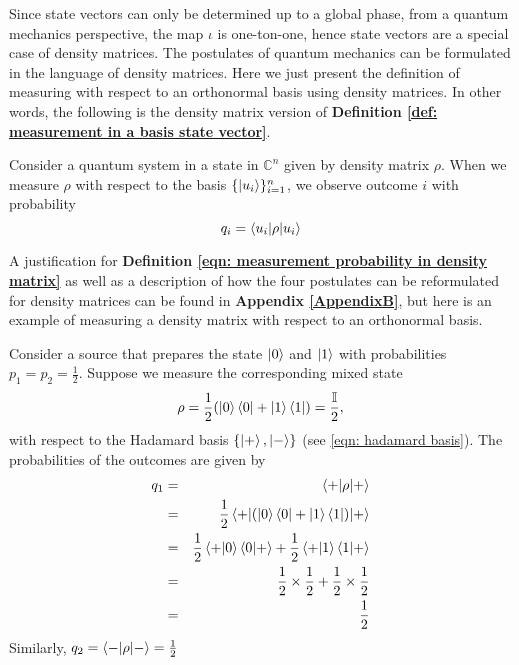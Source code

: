 Since state vectors can only be determined up to a global phase, from a quantum mechanics perspective, the map $\iota$ is one-ton-one, hence state vectors are a special case of density matrices. The postulates of quantum mechanics can be formulated in the language of density matrices. Here we just present the definition of measuring with respect to an orthonormal basis using density matrices. In other words, the following is the density matrix version of \textbf{Definition \ref{def: measurement in a basis state vector}}.


\begin{definition}
Consider a quantum system in a state in $\mathbb{C}^n$ given by density matrix $\rho$.  When we measure $\rho$ with respect to the basis $\{\ket{u_i}\}_{i=1}^n$, we observe outcome $i$ with probability 
\begin{equation} \label{eqn: measurement probability in density matrix}
    q_i=\braket{u_i | \rho |u_i}
\end{equation}
\end{definition}


A justification for \textbf{Definition \ref{eqn: measurement probability in density matrix}} as well as a description of how the four postulates can be reformulated for density matrices can be found in \textbf{Appendix \ref{AppendixB}}, but here is an example of measuring a density matrix with respect to an orthonormal basis.

\begin{example}
Consider a source that prepares the state $\ket{0}$ and $\ket{1}$ with probabilities $p_1=p_2=\frac{1}{2}$. Suppose we measure the corresponding mixed state
$$\rho=\frac{1}{2}(\ket{0}\bra{0}+\ket{1}\bra{1})=\frac{\mathbb{I}}{2},$$
with respect to the Hadamard basis $\{\ket{+}, \ket{-}\}$ (see \eqref{eqn: hadamard basis}). The probabilities of the outcomes are given by 
\begin{eqnarray}
    q_1&=&\braket{+|\rho|+}\\
    &=&\frac{1}{2}\braket{+|(\ket{0}\bra{0}+\ket{1}\bra{1})|+}\\
    &=&\frac{1}{2}\braket{+|0}\braket{0|+}+\frac{1}{2}\braket{+|1}\braket{1|+}\\
    &=&\frac{1}{2} \times \frac{1}{2} + \frac{1}{2} \times \frac{1}{2}\\
    &=&\frac{1}{2}
\end{eqnarray}
Similarly, $q_2=\braket{-|\rho|-}=\frac{1}{2}$
\end{example}


